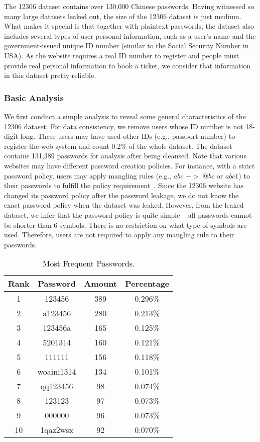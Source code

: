 The 12306 dataset contains over 130,000 Chinese passwords. Having
witnessed so many large datasets leaked out, the size of the 12306
dataset is just medium. What makes it special is that together with
plaintext passwords, the dataset also includes several types of user
personal information, such as a user's name and the government-issued unique ID number
(similar to the Social Security Number in USA). As the
website requires a real ID number to register and people must provide
real personal information to book a ticket, we consider that information in this dataset pretty reliable.


\subsubsection{Basic Analysis}
We first conduct a simple analysis to reveal some general
characteristics of the 12306 dataset.  For data consistency, we remove
users whose ID number is not 18-digit long. These users may have used
other IDs (e.g., passport number) to register the web system and count
0.2\% of the whole dataset. The dataset contains 131,389 passwords for
analysis after being cleansed. Note that various websites may have
different password creation policies. For instance, with a strict
password policy, users may apply mangling rules (e.g., $abc$ $->$
$@bc$ or $abc1$) to their passwords to fulfill the policy
requirement~\cite{weir2010testing}. Since the 12306 website has
changed its password policy after the password leakage, we do not know
the exact password policy when the dataset was leaked. However, from
the leaked dataset, we infer that the password policy is quite simple
-- all passwords cannot be shorter than 6 symbols. There is no
restriction on what type of symbols are used. Therefore, users are not
required to apply any mangling rule to their passwords.

\begin{table}
\centering
\caption{Most Frequent Passwords.}
\begin{tabular}{|c|c|c|c|} \hline
Rank&Password&Amount&Percentage\\ \hline
1&123456&389&0.296\%\\ 
2&a123456&280&0.213\%\\ 
3&123456a&165&0.125\%\\ 
4&5201314&160&0.121\%\\ 
5&111111&156&0.118\%\\ 
6&woaini1314&134&0.101\%\\ 
7&qq123456&98&0.074\%\\ 
8&123123&97&0.073\%\\ 
9&000000&96&0.073\%\\ 
10&1qaz2wsx&92&0.070\%\\ 
\hline\end{tabular}
\label{t1}
\vspace{-0.1in}
\end{table}


